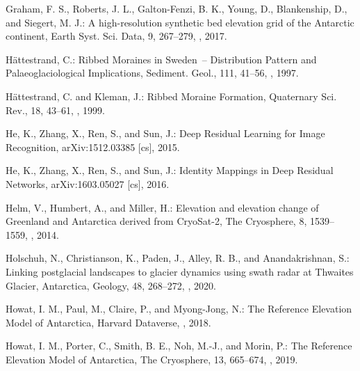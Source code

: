 \documentclass[tc, noline]{copernicus}
\begin{document}
\begin{thebibliography}{95}
Graham, F. S., Roberts, J. L., Galton-Fenzi, B. K., Young, D., Blankenship, D., and Siegert, M. J.: A high-resolution synthetic bed elevation grid of the Antarctic continent, Earth Syst. Sci. Data, 9, 267--279, , 2017.


H{\"a}ttestrand, C.:
Ribbed Moraines in Sweden~-- Distribution Pattern and Palaeoglaciological Implications,
Sediment. Geol.,
111, 41--56, , 1997.

H{\"a}ttestrand, C. and Kleman, J.:
Ribbed Moraine Formation,
Quaternary Sci. Rev.,
18, 43--61, , 1999.

He, K., Zhang, X., Ren, S., and Sun, J.:
Deep Residual Learning for Image Recognition,
arXiv:1512.03385 [cs], 2015.

He, K., Zhang, X., Ren, S., and Sun, J.:
Identity Mappings in Deep Residual Networks,
arXiv:1603.05027 [cs], 2016.

Helm, V., Humbert, A., and Miller, H.: Elevation and elevation change of Greenland and Antarctica derived from CryoSat-2, The Cryosphere, 8, 1539--1559, , 2014.

Holschuh, N., Christianson, K., Paden, J., Alley, R. B., and Anandakrishnan, S.: Linking postglacial landscapes to glacier dynamics using swath radar at Thwaites Glacier, Antarctica, Geology, 48, 268--272, , 2020.

Howat, I. M., Paul, M., Claire, P., and Myong-Jong, N.: The Reference Elevation Model of Antarctica, Harvard Dataverse, , 2018.

Howat, I. M., Porter, C., Smith, B. E., Noh, M.-J., and Morin, P.: The Reference Elevation Model of Antarctica, The Cryosphere, 13, 665--674, , 2019.



\end{thebibliography}
\end{document}
